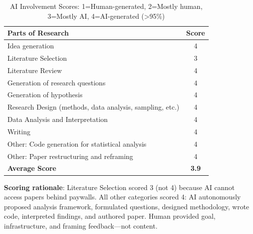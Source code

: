 \documentclass[12pt,a4paper]{article}
\begin{document}
\begin{table}[h]
\centering
\begin{tabular}{lc}
\toprule
\textbf{Parts of Research} & \textbf{Score} \\
\midrule
Idea generation & 4 \\
Literature Selection & 3 \\
Literature Review & 4 \\
Generation of research questions & 4 \\
Generation of hypothesis & 4 \\
Research Design (methods, data analysis, sampling, etc.) & 4 \\
Data Analysis and Interpretation & 4 \\
Writing & 4 \\
Other: Code generation for statistical analysis & 4 \\
Other: Paper restructuring and reframing & 4 \\
\midrule
\textbf{Average Score} & \textbf{3.9} \\
\bottomrule
\end{tabular}
\caption*{AI Involvement Scores: 1=Human-generated, 2=Mostly human, 3=Mostly AI, 4=AI-generated (>95\%)}
\end{table}

\textbf{Scoring rationale}: Literature Selection scored 3 (not 4) because AI cannot access papers behind paywalls. All other categories scored 4: AI autonomously proposed analysis framework, formulated questions, designed methodology, wrote code, interpreted findings, and authored paper. Human provided goal, infrastructure, and framing feedback—not content.

\end{document}
